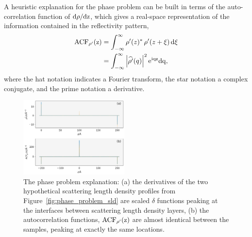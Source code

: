 \documentclass[
 reprint,
 superscriptaddress,
 amsmath,amssymb,
 aps,
]{revtex4-1}
\newcommand{\rmd}{\rm{d}}
\newcommand{\acf}{\rm{ACF}}
\begin{document}
A heuristic explanation for the phase problem can be built in terms of the auto-correlation function of $\rmd\rho/\rmd z$, which gives a real-space representation of the information contained in the reflectivity pattern,
%
\begin{equation}
    \begin{aligned}
        \acf_{\rho'}(z) & = \int_{-\infty}^{\infty} \rho'(z)^* \, \rho'(z + \xi) \, \rmd \xi \\
                        & = \int_{-\infty}^{\infty} \left| \widehat{\rho'}(q)  \right|^{2} \rm{e}^{iqz} \rmd q,
    \end{aligned}
    \label{equ:acf}
\end{equation}
%
where the hat notation indicates a Fourier transform, the star notation a complex conjugate, and the prime notation a derivative.
\begin{figure}
    \includegraphics[width=0.49\textwidth]{phase_problem_ACF.pdf}
    \caption{The phase problem explanation: (a) the derivatives of the two hypothetical scattering length density profiles from Figure~\ref{fig:phase_problem_sld} are scaled $\delta$ functions peaking at the interfaces between scattering length density layers, (b) the autocorrelation functions, $\acf_{\rho'}(z)$ are almost identical between the samples, peaking at exactly the same locations.}
    \label{fig:phase_problem_acf}
\end{figure}
\end{document}
